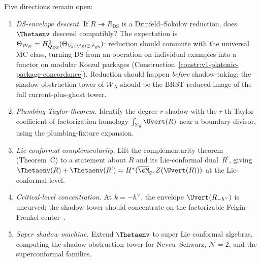 \begin{remark}
\label{rem:envelope-shadow-frontier}
Five directions remain open:
\begin{enumerate}[label=\textup{(\roman*)},nosep]
\item \emph{DS-envelope descent.}
 If $R \twoheadrightarrow R_{\mathrm{DS}}$ is a
 Drinfeld--Sokolov reduction, does $\Thetaenv$ descend
 compatibly? The expectation is
 $\Theta_{\mathcal{W}_N}
 = H^0_{Q_{\mathrm{DS}}}(\Theta_{V_k(\fg)\otimes
 \mathcal{F}_{\mathrm{gh}}})$:
 reduction should commute with the universal MC class,
 turning DS from an operation on individual examples into
 a functor on modular Koszul packages
 (Construction~\ref{constr:v1-platonic-package-concordance}).
 Reduction should happen \emph{before} shadow-taking:
 the shadow obstruction tower of $\mathcal{W}_N$ should be the
 BRST-reduced image of the full current-plus-ghost tower.
\item \emph{Plumbing-Taylor theorem.}
 Identify the degree-$r$ shadow with the $r$-th Taylor
 coefficient of factorization homology
 $\int_{\Sigma_g} \Uvert(R)$ near a boundary divisor,
 using the plumbing-fixture expansion.
\item \emph{Lie-conformal complementarity.}
 Lift the complementarity theorem (Theorem~C) to a statement
 about $R$ and its Lie-conformal dual~$R^!$, giving
 $\Thetaenv(R) + \Thetaenv(R^!) = H^*(\overline{\cM}_g,
 Z(\Uvert(R)))$ at the Lie-conformal level.
\item \emph{Critical-level concentration.}
 At $k = -h^\vee$, the envelope
 $\Uvert(R_{-h^\vee})$ is uncurved; the shadow
 tower should concentrate on the factorizable
 Feigin--Frenkel center~\cite{CM25}.
\item \emph{Super shadow machine.}
 Extend $\Thetaenv$ to super Lie conformal algebras,
 computing the shadow obstruction tower for Neveu--Schwarz,
 $\mathcal{N}=2$, and the superconformal families.
\end{enumerate}
\end{remark}

